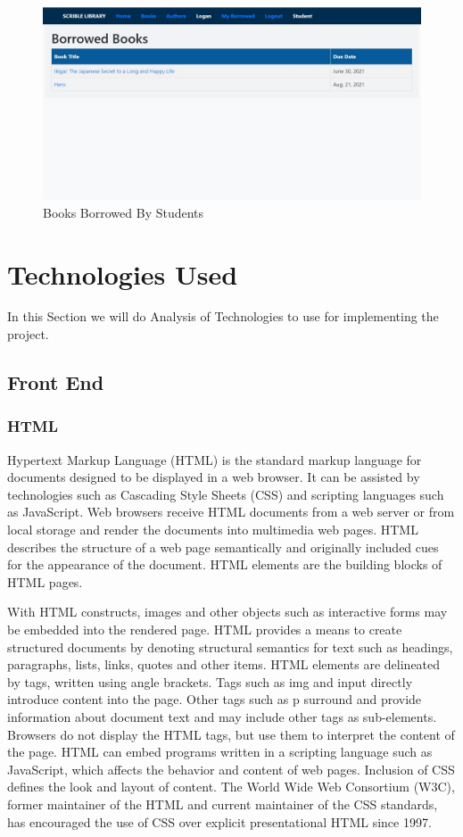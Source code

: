 \newpage
\begin{figure}[htb]
	\centering
	\includegraphics[scale=0.4, angle=90]{./students} 
	\caption{Books Borrowed By Students}
	\label{fig:label} 
\end{figure}

\newpage
\section{Technologies Used}

In this Section we will do Analysis of Technologies to use for implementing the project.
\subsection{Front End}
\subsubsection{HTML}
Hypertext Markup Language (HTML) is the standard markup language for documents designed to
be displayed in a web browser. It can be assisted by technologies such as Cascading Style Sheets
(CSS) and scripting languages such as JavaScript.
Web browsers receive HTML documents from a
web server or from local storage and render the documents into multimedia web pages. HTML
describes the structure of a web page semantically and originally included cues for the appearance
of the document.
HTML elements are the building blocks of HTML pages.\par With HTML constructs, images and other
objects such as interactive forms may be embedded into the rendered page. HTML provides a
means to create structured documents by denoting structural semantics for text such as headings,
paragraphs, lists, links, quotes and other items. HTML elements are delineated by tags, written
using angle brackets. Tags such as img and input directly introduce content into the page.
Other tags such as p surround and provide information about document text and may include
other tags as sub-elements. Browsers do not display the HTML tags, but use them to interpret the
content of the page.
HTML can embed programs written in a scripting language such as JavaScript, which affects the
behavior and content of web pages. Inclusion of CSS defines the look and layout of content. The
World Wide Web Consortium (W3C), former maintainer of the HTML and current maintainer of the
CSS standards, has encouraged the use of CSS over explicit presentational HTML since 1997.
 
